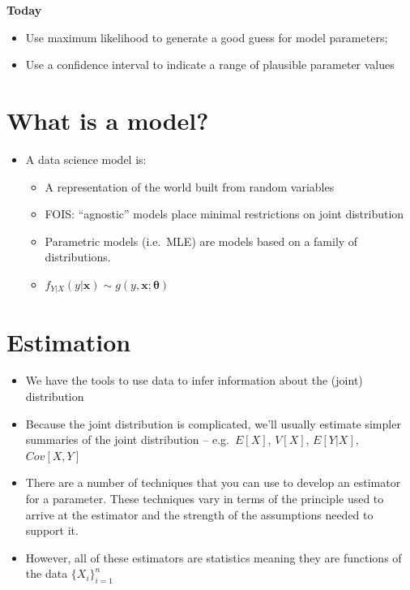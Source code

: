 \documentclass[
]{book}
\providecommand{\tightlist}{%
  \setlength{\itemsep}{0pt}\setlength{\parskip}{0pt}}
\theoremstyle{definition}
\theoremstyle{definition}
\theoremstyle{definition}
\theoremstyle{definition}
\theoremstyle{remark}
\begin{document}
\textbf{Today}

\begin{itemize}
\tightlist
\item
  Use maximum likelihood to generate a good guess for model parameters;
\item
  Use a confidence interval to indicate a range of plausible parameter values
\end{itemize}

\hypertarget{what-is-a-model}{%
\section{What is a model?}\label{what-is-a-model}}

\begin{itemize}
\tightlist
\item
  A data science model is:

  \begin{itemize}
  \tightlist
  \item
    A representation of the world built from random variables
  \item
    FOIS: ``agnostic'' models place minimal restrictions on joint distribution
  \item
    Parametric models (i.e.~MLE) are models based on a family of distributions.
  \item
    \(f_{Y|X}(y|\mathbf{x}) \sim g(y, \mathbf{x}; \mathbf{\theta})\)
  \end{itemize}
\end{itemize}

\hypertarget{estimation-1}{%
\section{Estimation}\label{estimation-1}}

\begin{itemize}
\item
  We have the tools to use data to infer information about the (joint) distribution
\item
  Because the joint distribution is complicated, we'll usually estimate simpler summaries of the joint distribution -- e.g.~\(E[X]\), \(V[X]\), \(E[Y|X]\), \(Cov[X,Y]\)
\item
  There are a number of techniques that you can use to develop an estimator for a parameter. These techniques vary in terms of the principle used to arrive at the estimator and the strength of the assumptions needed to support it.
\item
  However, all of these estimators are statistics meaning they are functions of the data \(\{X_i\}_{i=1}^n\)
\end{itemize}
\end{document}

